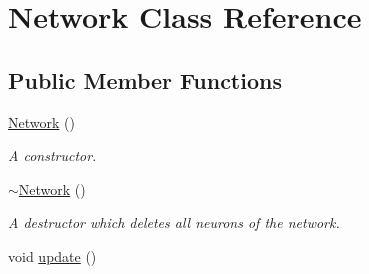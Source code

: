 \hypertarget{classNetwork}{\section{Network Class Reference}
\label{classNetwork}
}
\subsection*{Public Member Functions}
\begin{DoxyCompactItemize}
\item 
\hyperlink{classNetwork_a3cc2fb4f8fa4d507077e8da85ce5a1c8}{Network} ()
\begin{DoxyCompactList}\small\item\em A constructor. \end{DoxyCompactList}\item 
\hypertarget{classNetwork_a7a4e19cdb4bf0c7ecf82baa643831492}{\hyperlink{classNetwork_a7a4e19cdb4bf0c7ecf82baa643831492}{$\sim$\-Network} ()}\label{classNetwork_a7a4e19cdb4bf0c7ecf82baa643831492}

\begin{DoxyCompactList}\small\item\em A destructor which deletes all neurons of the network. \end{DoxyCompactList}\item 
\hypertarget{classNetwork_ab07bb6f6d9020b9eb230551083ea929f}{void \hyperlink{classNetwork_ab07bb6f6d9020b9eb230551083ea929f}{update} ()}\label{classNetwork_ab07bb6f6d9020b9eb230551083ea929f}


\end{DoxyCompactItemize}
